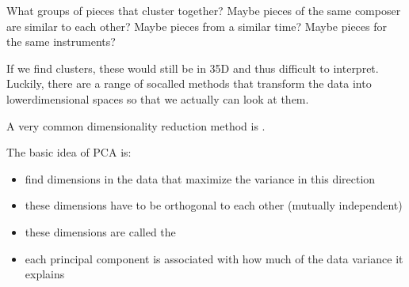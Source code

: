 \documentclass[letterpaper,10pt,english]{sphinxmanual}
\begin{document}
What groups of pieces that cluster together? Maybe pieces of the same
composer are similar to each other? Maybe pieces from a similar time?
Maybe pieces for the same instruments?

If we find clusters, these would still be in 35\sphinxhyphen{}D and thus difficult to
interpret. Luckily, there are a range of so\sphinxhyphen{}called  methods that transform the data into lower\sphinxhyphen{}dimensional spaces
so that we actually can look at them.

A very common dimensionality reduction method is .

The basic idea of PCA is:
\begin{itemize}
\item {} 
find dimensions in the data that maximize the variance in this
direction

\item {} 
these dimensions have to be orthogonal to each other (mutually
independent)

\item {} 
these dimensions are called the 

\item {} 
each principal component is associated with how much of the data
variance it explains

\end{itemize}

\begin{sphinxVerbatim}[commandchars=\\\{\}]
    
 
    

   
 
   
\end{sphinxVerbatim}
\end{document}

